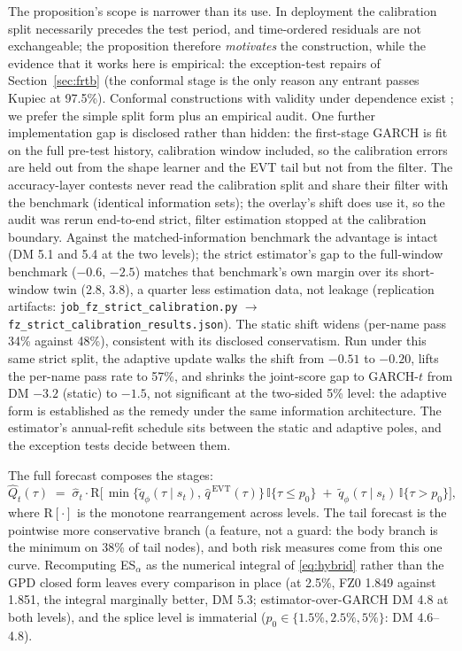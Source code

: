 \documentclass[11pt]{article}
\theoremstyle{remark}
\begin{document}
The proposition's scope is narrower than its use. In
deployment the calibration split necessarily precedes the test period,
and time-ordered residuals are not exchangeable; the proposition
therefore \emph{motivates} the construction, while the evidence that it works here is empirical: the exception-test repairs of
Section~\ref{sec:frtb} (the conformal stage is the only reason any
entrant passes Kupiec at 97.5\%). Conformal constructions with
validity under dependence exist \citep{chernozhukov2018conformal}; we
prefer the simple split form plus an empirical audit. One further
implementation gap is disclosed rather than hidden: the first-stage
GARCH is fit on the full pre-test history, calibration window
included, so the calibration errors are held out from the shape
learner and the EVT tail but not from the filter. The accuracy-layer
contests never read the calibration split and share their filter with
the benchmark (identical information sets); the overlay's shift does
use it, so the audit was rerun end-to-end strict, filter estimation
stopped at the calibration boundary. Against the matched-information
benchmark the advantage is intact (DM 5.1 and 5.4 at the two levels);
the strict estimator's gap to the full-window benchmark ($-0.6$, $-2.5$)
matches that benchmark's own margin over its short-window twin (2.8, 3.8), a quarter less estimation data, not leakage (replication
artifacts: \texttt{job\_fz\_strict\_calibration.py} $\to$
\texttt{fz\_strict\_calibration\_results.json}). The static shift
widens (per-name pass 34\% against 48\%), consistent with its
disclosed conservatism. Run under this same strict split, the adaptive
update \citep{gibbs2021aci} walks the shift from $-0.51$ to $-0.20$,
lifts the per-name pass rate to 57\%, and shrinks the joint-score gap
to GARCH-$t$ from DM $-3.2$ (static) to $-1.5$, not significant at the
two-sided 5\% level: the adaptive form is established as the remedy
under the same information architecture. The estimator's annual-refit
schedule sits between the static and adaptive poles, and the exception
tests decide between them.

The full forecast composes the stages:
\begin{equation}
\widehat{Q}_t(\tau) \;=\; \widehat{\sigma}_t \cdot
\mathrm{R}\Big[\, \min\{\widetilde{q}_\phi(\tau \mid s_t),\,
\widehat{q}^{\,\mathrm{EVT}}(\tau)\}\,\mathbb{I}\{\tau \le p_0\}
\;+\; \widetilde{q}_\phi(\tau \mid s_t)\,\mathbb{I}\{\tau > p_0\}
\Big],
\label{eq:hybrid}
\end{equation}
where $\mathrm{R}[\cdot]$ is the monotone rearrangement across
levels. The tail forecast is the pointwise more conservative branch (a
feature, not a guard: the body branch is the minimum on 38\% of tail
nodes), and both risk measures come from this one curve. Recomputing
ES$_\alpha$ as the numerical integral of \eqref{eq:hybrid} rather than
the GPD closed form leaves every comparison in place (at 2.5\%, FZ0
1.849 against 1.851, the integral marginally better, DM 5.3;
estimator-over-GARCH DM 4.8 at both levels), and the splice level is
immaterial ($p_0\in\{1.5\%,2.5\%,5\%\}$: DM 4.6--4.8).
\end{document}

